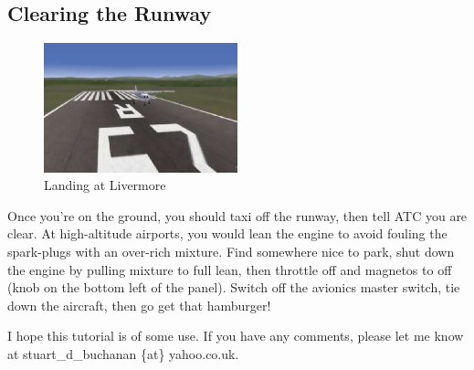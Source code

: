 \subsection{Clearing the Runway}

\begin{figure}[!htp]
\centering
\includegraphics[width=0.5\textwidth]{landing}
\caption{Landing at Livermore}
\end{figure}

Once you're on the ground, you should taxi off the runway, then tell ATC you are clear. At high-altitude airports, you would lean the engine to avoid fouling the spark-plugs with an over-rich mixture. Find somewhere nice to park, shut down the engine by pulling mixture to full lean, then throttle off and magnetos to off (knob on the bottom left of the panel). Switch off the avionics master switch, tie down the aircraft, then go get that hamburger!

I hope this tutorial is of some use. If you have any comments, please let me know at stuart\_d\_buchanan \{at\} yahoo.co.uk.